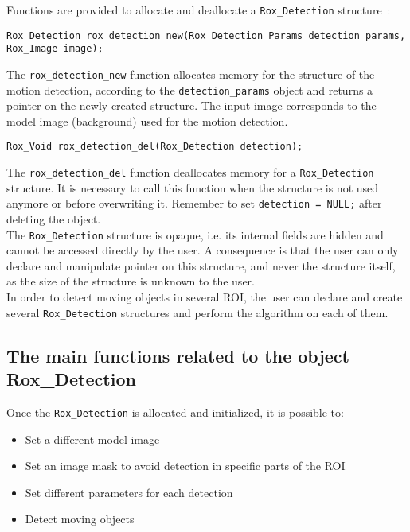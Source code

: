 Functions are provided to allocate and deallocate a \lstinline$Rox_Detection$ structure~:
\begin{lstlisting}
Rox_Detection rox_detection_new(Rox_Detection_Params detection_params, Rox_Image image);
\end{lstlisting}
The \lstinline$rox_detection_new$ function allocates memory for the structure of the motion detection, according to
the \lstinline$detection_params$ object and returns a pointer on the newly created structure. The input image corresponds to the model image (background) used for the motion detection. \\

\begin{lstlisting}
Rox_Void rox_detection_del(Rox_Detection detection);
\end{lstlisting}
The \lstinline$rox_detection_del$ function deallocates memory for a \lstinline$Rox_Detection$ structure. 
It is necessary to call this function when the structure is not used anymore or before overwriting it. 
Remember to set \lstinline$detection = NULL;$ after deleting the object.
\\

The \lstinline$Rox_Detection$ structure is opaque, i.e. its internal
fields are hidden and cannot be accessed directly by the user. A
consequence is that the user can only declare and manipulate pointer
on this structure, and never the structure itself, as the size of the
structure is unknown to the user.\\

In order to detect moving objects in several ROI, the user can declare and create
several \lstinline$Rox_Detection$ structures and perform the algorithm on each of
them. \\

\subsection{The main functions related to the object Rox\_Detection}
\label{sss:detection_methods}

Once the \lstinline$Rox_Detection$ is allocated and initialized, it is possible to:
\begin{itemize}
  \item Set a different model image
  \item Set an image mask to avoid detection in specific parts of the ROI
  \item Set different parameters for each detection
  \item Detect moving objects
\end{itemize}

